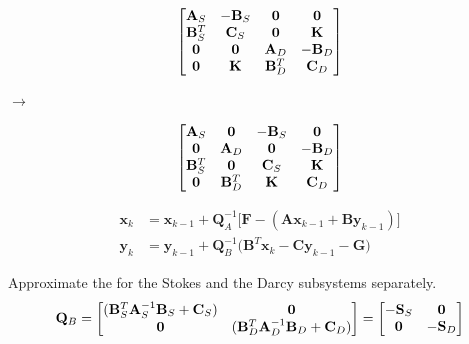 \documentclass[usenames,dvipsnames,letterpaper,landscape,final]{slides}
\theoremstyle{definition}
\begin{document}
\begin{myslide}
		  \parbox{0.4\textwidth}{\raggedright
\begin{equation*}
\begin{bmatrix}
\bold{A}_S   & -\bold{B}_S & \bold{0}     &  \bold{0}   \\
\bold{B}_S^T &  \bold{C}_S & \bold{0}     &  \bold{K}   \\
\bold{0}     &  \bold{0}   & \bold{A}_D   & -\bold{B}_D \\
\bold{0}     &  \bold{K}   & \bold{B}_D^T &  \bold{C}_D
\end{bmatrix}
\end{equation*}
		  }\parbox{0.2\textwidth}{\centering
$\rightarrow$
		  }\parbox{0.4\textwidth}{\raggedright
\begin{equation*}
\begin{bmatrix}
\bold{A}_S   & \bold{0}     & -\bold{B}_S &  \bold{0}   \\
\bold{0}     & \bold{A}_D   &  \bold{0}   & -\bold{B}_D \\
\bold{B}_S^T & \bold{0}     &  \bold{C}_S &  \bold{K}   \\
\bold{0}     & \bold{B}_D^T &  \bold{K}   &  \bold{C}_D
\end{bmatrix}
\end{equation*}
		  }

\bigskip
\begin{equation*}\label{eq:uzawasystem}
		  \begin{aligned}
					 \mathbf{x}_k &= \mathbf{x}_{k-1} + \mathbf{Q}_A^{-1} \big[\mathbf{F} - (\mathbf{A}\mathbf{x}_{k-1} + \mathbf{B}\mathbf{y}_{k-1})\big]\\
					 \mathbf{y}_k &= \mathbf{y}_{k-1} + \mathbf{Q}_B^{-1}\big(\mathbf{B}^T\mathbf{x}_{k} - \mathbf{C}\mathbf{y}_{k-1} -\mathbf{G}\big)
		  \end{aligned}
\end{equation*}

\bigskip

		  Approximate the  for the Stokes and the Darcy subsystems
separately.
\begin{equation*}
		  \mathbf{Q}_B = \begin{bmatrix}
			 (\bold{B}_S^T\bold{A}_S^{-1}\bold{B}_S + \bold{C}_S) &\mathbf{0}\\
          \mathbf{0} & (\bold{B}_D^T\bold{A}_D^{-1}\bold{B}_D + \bold{C}_D)
		  \end{bmatrix} = \begin{bmatrix}
					 -\mathbf{S}_S & \mathbf{0}\\
					 \mathbf{0} & -\mathbf{S}_D
		  \end{bmatrix}
\end{equation*}

\end{myslide}
\end{document}
